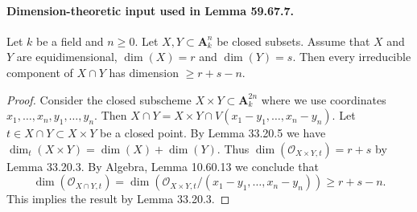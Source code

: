 \paragraph{Dimension-theoretic input used in Lemma 59.67.7.}
\begin{lemma}[33.34.2, Tag 0B2Q]
Let $k$ be a field and $n\geq0$. Let $X,Y\subset\mathbf A^n_k$ be closed subsets. Assume that $X$ and $Y$ are equidimensional, $\dim(X)=r$ and $\dim(Y)=s$. Then every irreducible component of $X\cap Y$ has dimension $\geq r+s-n$.
\end{lemma}
\begin{proof}
Consider the closed subscheme $X\times Y\subset\mathbf A^{2n}_k$ where we use coordinates $x_1,\ldots,x_n,y_1,\ldots,y_n$. Then $X\cap Y=X\times Y\cap V(x_1-y_1,\ldots,x_n-y_n)$. Let $t\in X\cap Y\subset X\times Y$ be a closed point. By Lemma 33.20.5 we have $\dim_t(X\times Y)=\dim(X)+\dim(Y)$. Thus $\dim(\mathcal O_{X\times Y,t})=r+s$ by Lemma 33.20.3. By Algebra, Lemma 10.60.13 we conclude that
\[\dim(\mathcal O_{X\cap Y,t})=\dim(\mathcal O_{X\times Y,t}/(x_1-y_1,\ldots,x_n-y_n))\geq r+s-n.\]
This implies the result by Lemma 33.20.3.
\end{proof}
